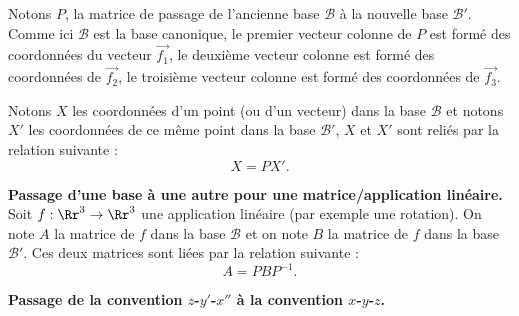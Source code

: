 \documentclass[11pt,class=report,crop=false]{standalone}
\begin{document}
Notons $P$, la matrice de passage de l'ancienne base $\mathcal{B}$ à la nouvelle base $\mathcal{B}'$.
Comme ici $\mathcal{B}$ est la base canonique, le premier vecteur colonne de $P$ est formé des coordonnées du vecteur $\vec{f_1}$, le deuxième vecteur colonne  est formé des coordonnées de $\vec{f_2}$, le troisième vecteur colonne  est formé des coordonnées de $\vec{f_3}$.

Notons $X$ les coordonnées d'un point (ou d'un vecteur) dans la base $\mathcal{B}$ et notons $X'$ les coordonnées de ce même point dans la base $\mathcal{B}'$, $X$ et $X'$ sont reliés par la relation suivante :
$$X = PX'.$$

\medskip

\textbf{Passage d'une base à une autre pour une matrice/application linéaire.}
Soit $f : \Rr^3 \to \Rr^3$ une application linéaire (par exemple une rotation). On note $A$ la matrice de $f$ dans la base $\mathcal{B}$ et on note $B$ la matrice de $f$ dans la base $\mathcal{B}'$. Ces deux matrices sont liées par la relation suivante :
$$A = PBP^{-1}.$$

\textbf{Passage de la convention $z$-$y'$-$x''$ à la convention $x$-$y$-$z$.}
\end{document}
